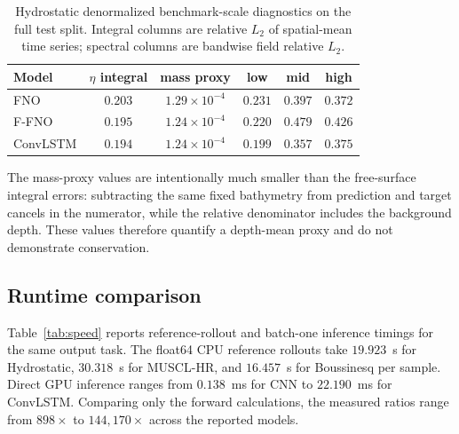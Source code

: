 \begin{table}[pos=!htbp]
\centering
\caption{Hydrostatic denormalized benchmark-scale diagnostics on the full test split. Integral columns are relative $L_2$ of spatial-mean time series; spectral columns are bandwise field relative $L_2$.}
\label{tab:physics-diag}
\begin{tabular}{lccccc}
    \toprule
    Model & $\eta$ integral & mass proxy & low & mid & high \\
    \midrule
    FNO      & $0.203$ & $1.29 \times 10 ^ {-4}$ & $0.231$ & $0.397$ & $0.372$ \\
    F-FNO    & $0.195$ & $1.24 \times 10 ^ {-4}$ & $0.220$ & $0.479$ & $0.426$ \\
    ConvLSTM & $0.194$ & $1.24 \times 10 ^ {-4}$ & $0.199$ & $0.357$ & $0.375$ \\
    \bottomrule
\end{tabular}
\end{table}

The mass-proxy values are intentionally much smaller than the free-surface integral errors: subtracting the same fixed bathymetry from prediction and target cancels in the numerator, while the relative denominator includes the background depth. These values therefore quantify a depth-mean proxy and do not demonstrate conservation.

\FloatBarrier
\subsection{Runtime comparison}
\label{subsec:res-speed}

Table~\ref{tab:speed} reports reference-rollout and batch-one inference timings for the same output task. The float64 CPU reference rollouts take $19.923$~s for Hydrostatic, $30.318$~s for MUSCL-HR, and $16.457$~s for Boussinesq per sample. Direct GPU inference ranges from $0.138$~ms for CNN to $22.190$~ms for ConvLSTM. Comparing only the forward calculations, the measured ratios range from $898 \times$ to $144{,}170 \times$ across the reported models.

